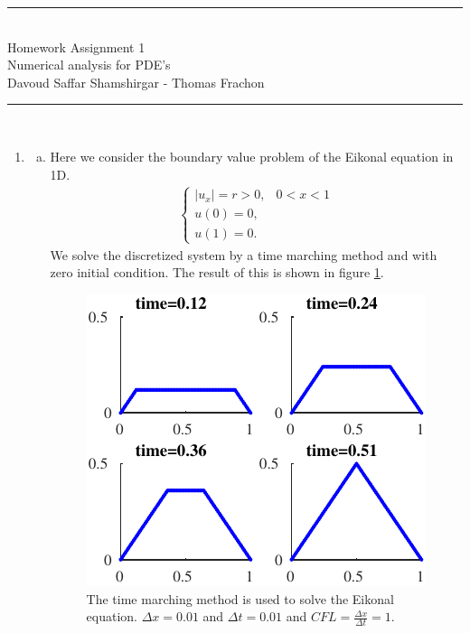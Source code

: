 \documentclass[10pt,a4paper,twoside, french]{article}
\numberwithin{equation}{section}
\numberwithin{figure}{section}
\numberwithin{table}{section}
\begin{document}
	\vspace{1cm}    
    \begin{center}
       		\rule{10cm}{1pt} \\[0.6cm]         %
        	{\huge Homework Assignment 1 \\[0.2cm]
         \Large  Numerical analysis for PDE's\\[0.2cm] 
          \large Davoud Saffar Shamshirgar - Thomas Frachon}  \\[0.6cm]
    		\rule{10cm}{1pt} \\[0.5cm]  
	\end{center}    
	
\setcounter{section}{1}
\begin{enumerate}
\item \begin{enumerate}[a.]
\item Here we consider the boundary value problem of the Eikonal equation in 1D.
\begin{align*}
\left\{
	\begin{array}{ll}
		|u_x|= r >0, & 0<x<1 \\
		u(0) = 0, \\
		u(1) = 0.
	\end{array}
\right.
\end{align*}
We solve the discretized system by a time marching method and with zero initial condition. The result of this is shown in figure \ref{fig:task1}.
\begin{figure}[h]
\centering
\includegraphics[scale=1.5]{fig/Task1}
\caption{The time marching method is  used to solve the Eikonal equation. $\Delta x=0.01$ and $\Delta t=0.01$ and $CFL=\frac{\Delta x}{\Delta t}=1$.}
\label{fig:task1}
\end{figure}


\end{enumerate}
\end{enumerate}
\end{document}
